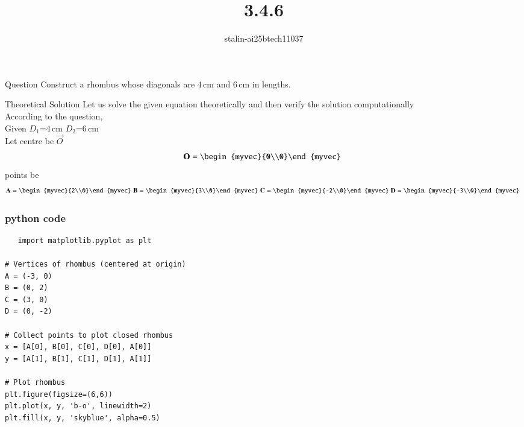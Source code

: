 \documentclass{beamer}
\title %
{3.4.6}
\author %
{stalin-ai25btech11037}
\begin{document}
\frame{\titlepage}
\begin{frame}{Question}
Construct a rhombus whose diagonals are \(4 \, \text{cm}\) and \(6 \, \text{cm}\) in lengths.\\ 
\end{frame}
\begin{frame}{Theoretical Solution}
Let us solve the given equation theoretically and then verify the solution computationally \\
According to the question, \\
Given $D_1$=\(4 \, \text{cm}\) $D_2$=\(6 \, \text{cm}\)\\
Let centre be $\vec{O}$ 
\begin{align}
  \vec{O}=\begin{myvec}{0\\0}\end{myvec}\;
  \end{align}
points be
  \begin{align}
  \vec{A}=\begin{myvec}{2\\0}\end{myvec}\;
  \vec{B}=\begin{myvec}{3\\0}\end{myvec}\;
\vec{C}=\begin{myvec}{-2\\0}\end{myvec}\
  \vec{D}=\begin{myvec}{-3\\0}\end{myvec}\
   \end{align}
\end{frame}
\begin{frame}[fragile]
    \frametitle{python code }
    \begin{lstlisting}
   import matplotlib.pyplot as plt

# Vertices of rhombus (centered at origin)
A = (-3, 0)
B = (0, 2)
C = (3, 0)
D = (0, -2)

# Collect points to plot closed rhombus
x = [A[0], B[0], C[0], D[0], A[0]]
y = [A[1], B[1], C[1], D[1], A[1]]

# Plot rhombus
plt.figure(figsize=(6,6))
plt.plot(x, y, 'b-o', linewidth=2)
plt.fill(x, y, 'skyblue', alpha=0.5)










    \end{lstlisting}
\end{frame}
\end{document}
